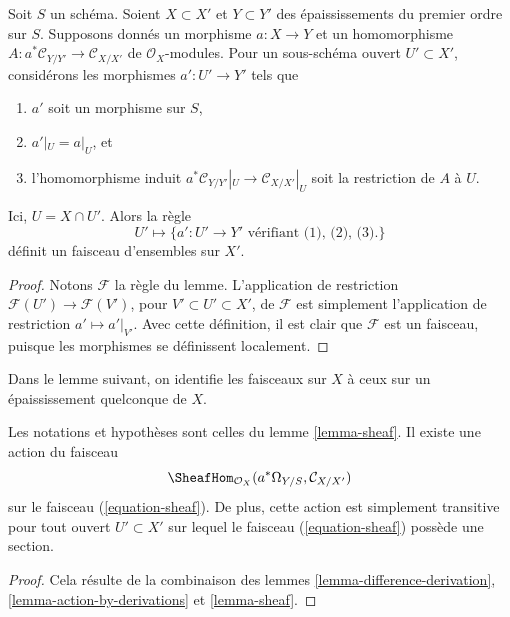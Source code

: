 \begin{lemma}
\label{lemma-sheaf}
Soit $S$ un schéma.
Soient $X \subset X'$ et $Y \subset Y'$ des épaississements du premier ordre
sur $S$. Supposons donnés un morphisme $a : X \to Y$ et un homomorphisme
$A : a^*\mathcal{C}_{Y/Y'} \to \mathcal{C}_{X/X'}$ de
$\mathcal{O}_X$-modules. Pour un sous-schéma ouvert $U' \subset X'$,
considérons les morphismes $a' : U' \to Y'$ tels que
\begin{enumerate}
\item $a'$ soit un morphisme sur $S$,
\item $a'|_U = a|_U$, et
\item l'homomorphisme induit
$a^*\mathcal{C}_{Y/Y'}|_U \to \mathcal{C}_{X/X'}|_U$
soit la restriction de $A$ à $U$.
\end{enumerate}
Ici, $U = X \cap U'$. Alors la règle
\begin{equation}
\label{equation-sheaf}
U' \mapsto
\{a' : U' \to Y'\text{ vérifiant (1), (2), (3).}\}
\end{equation}
définit un faisceau d'ensembles sur $X'$.
\end{lemma}

\begin{proof}
Notons $\mathcal{F}$ la règle du lemme.
L'application de restriction $\mathcal{F}(U') \to \mathcal{F}(V')$, pour
$V' \subset U' \subset X'$,
de $\mathcal{F}$ est simplement l'application de restriction $a' \mapsto a'|_{V'}$.
Avec cette définition, il est clair que $\mathcal{F}$ est un
faisceau, puisque les morphismes se définissent localement.
\end{proof}

\noindent
Dans le lemme suivant, on identifie les faisceaux sur $X$ à ceux sur un épaississement
quelconque de $X$.

\begin{lemma}
\label{lemma-action-sheaf}
Les notations et hypothèses sont celles du lemme \ref{lemma-sheaf}.
Il existe une action du faisceau
$$
\SheafHom_{\mathcal{O}_X}(a^*\Omega_{Y/S}, \mathcal{C}_{X/X'})
$$
sur le faisceau (\ref{equation-sheaf}). De plus, cette action
est simplement transitive pour tout ouvert $U' \subset X'$ sur lequel le faisceau
(\ref{equation-sheaf}) possède une section.
\end{lemma}

\begin{proof}
Cela résulte de la combinaison des
lemmes \ref{lemma-difference-derivation},
\ref{lemma-action-by-derivations}
et \ref{lemma-sheaf}.
\end{proof}


